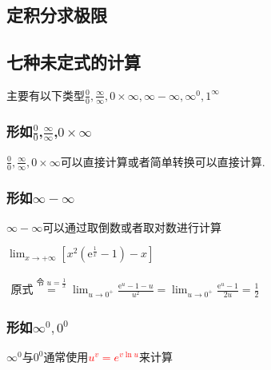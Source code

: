 \documentclass[12pt, a4paper, oneside, UTF8]{ctexbook}
\begin{document}
\begin{sloppypar}
    \subsection{定积分求极限}
    \subsection{七种未定式的计算}
    主要有以下类型$\frac{0}{0},\frac{\infty}{\infty},0 \times \infty,\infty -\infty,\infty ^0,1^\infty$
    \subsubsection{形如$\frac{0}{0}$,$\frac{\infty}{\infty}$,$0 \times \infty$}
         $\frac{0}{0},\frac{\infty}{\infty},0 \times \infty$可以直接计算或者简单转换可以直接计算.
    \subsubsection{形如$\infty -\infty$}
          $\infty -\infty$可以通过取倒数或者取对数进行计算
              \begin{problem}
              $\lim_{x\to+\infty}\left[x^2\left(\mathrm{e}^{\frac{1}{x}}-1\right)-x\right]$
              \end{problem}
              \begin{solution}
                  $
                      \begin{aligned}
                          \text{原式}\overset{\text{令 }u=\frac1x}{\operatorname*{=}}\lim_{u\to0^+}\frac{\mathrm{e}^u-1-u}{u^2}=\lim_{u\to0^+}\frac{\mathrm{e}^u-1}{2u}=\frac12
                      \end{aligned}
                  $
              \end{solution}
    \subsubsection{形如$\infty^0,0^0$}
          $\infty ^0$与$0^0$通常使用\textcolor{red}
              {$ u^v=e^{v \ln u}$}来计算


\end{sloppypar}
\end{document}

